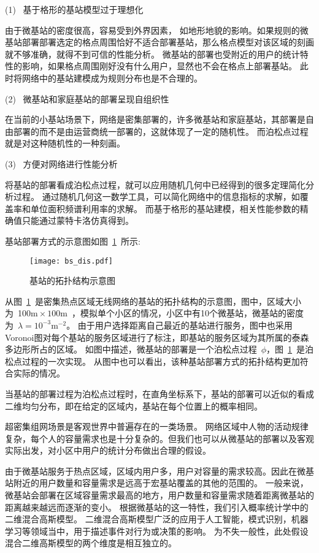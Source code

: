 (1)~ 基于格形的基站模型过于理想化

由于微基站的密度很高，容易受到外界因素，
如地形地貌的影响。如果规则的微基站部署部署选定的格点周围恰好不适合部署基站，那么格点模型对该区域的刻画就不够准确，就得不到可信的性能分析。
微基站的部署也受附近的用户的统计特性的影响，如果格点周围刚好没有什么用户，显然也不会在格点上部署基站。
此时将网络中的基站建模成为规则分布也是不合理的。

(2)~ 微基站和家庭基站的部署呈现自组织性

在当前的小基站场景下，网络是密集部署的，许多微基站和家庭基站，其部署是自由部署的而不是由运营商统一部署的，这就体现了一定的随机性。
而泊松点过程就是对这种随机性的一种刻画。

(3)~ 方便对网络进行性能分析

将基站的部署看成泊松点过程，就可以应用随机几何中已经得到的很多定理简化分析过程。
通过随机几何这一数学工具，可以简化网络中的信息指标的求解，如覆盖率和单位面积频谱利用率的求解。
而基于格形的基站建模，相关性能参数的精确值只能通过蒙特卡洛仿真得到。

基站部署方式的示意图如图~\ref{bs_dis}~所示:
\begin{figure}[htbp]
\centering
\texttt{[image: bs\_dis.pdf]}
\caption{基站的拓扑结构示意图}\vspace{-0.5em}
\label{bs_dis}
\end{figure}


从图~\ref{bs_dis}~是密集热点区域无线网络的基站的拓扑结构的示意图，图中，区域大小为~100$\mathrm{m}\times 100\mathrm{m}$~，模拟单个小区的情况，小区中有10个微基站，微基站的密度为~$\lambda=10^{-3}\mathrm{m}^{-2}$。
由于用户选择距离自己最近的基站进行服务，图中也采用Voronoi图对每个基站的服务区域进行了标注，即基站的服务区域为其所属的泰森多边形所占的区域。
如图中描述，微基站的部署是一个泊松点过程~$\phi$，图~\ref{bs_dis}~是泊松点过程的一次实现。
从图中也可以看出，该种基站部署方式的拓扑结构更加符合实际的情况。

当基站的部署过程为泊松点过程时，在直角坐标系下，基站的部署可以近似的看成二维均匀分布，即在给定的区域内，基站在每个位置上的概率相同。


超密集组网场景是客观世界中普遍存在的一类场景。
网络区域中人物的活动规律复杂，每个人的容量需求也是十分复杂的。但我们也可以从微基站的部署以及客观实际出发，对小区中用户的统计分布做出合理的假设。

由于微基站服务于热点区域，区域内用户多，用户对容量的需求较高。因此在微基站附近的用户数量和容量需求是远高于宏基站覆盖的其他的范围的。
一般来说，微基站会部署在区域容量需求最高的地方，用户数量和容量需求随着距离微基站的距离越来越远而逐渐的变小。
根据微基站的这一特性，我们引入概率统计学中的二维混合高斯模型。
二维混合高斯模型广泛的应用于人工智能，模式识别，机器学习等领域当中，用于描述事件对行为或决策的影响。
为不失一般性，此处假设混合二维高斯模型的两个维度是相互独立的。

